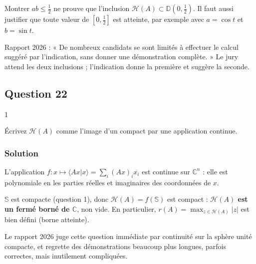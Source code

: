 \documentclass[11pt,a4paper]{article}
\newcommand{\equationajustee}[1]{%
  \sbox{\boiteequation}{$\displaystyle #1$}%
  \ifdim\wd\boiteequation>\linewidth
    \[\resizebox{\linewidth}{!}{\usebox{\boiteequation}}\]%
  \else
    \[#1\]%
  \fi}
\begin{document}
\equationajustee{\boxed{\mathcal H\begin{pmatrix}0&1\\0&0\end{pmatrix}=\mathbb D\big(0,\tfrac12\big)}}

\begin{piege}

Montrer \(ab\le\frac12\) ne prouve que l'inclusion \(\mathcal H(A)\subset\mathbb D(0,\frac12)\). Il faut aussi justifier que toute valeur de \([0,\frac12]\) est atteinte, par exemple avec \(a=\cos t\) et \(b=\sin t\).

\end{piege}

\begin{jury}

Rapport 2026 : « De nombreux candidats se sont limités à effectuer le calcul suggéré par l'indication, sans donner une démonstration complète. » Le jury attend les deux inclusions ; l'indication donne la première et suggère la seconde.

\end{jury}

\hypertarget{question-22}{%
\subsection{Question 22}\label{question-22}}

\begin{indication}{1}

Écrivez \(\mathcal H(A)\) comme l'image d'un compact par une application continue.

\end{indication}

\hypertarget{solution-21}{%
\subsubsection{Solution}\label{solution-21}}

L'application \(f:x\mapsto\langle Ax|x\rangle=\sum_i(Ax)_i\overline{x_i}\) est continue sur \(\mathbb C^n\) : elle est polynomiale en les parties réelles et imaginaires des coordonnées de \(x\).

\(\mathbb S\) est compacte (question 1), donc \(\mathcal H(A)=f(\mathbb S)\) est compact : \textbf{\(\mathcal H(A)\) est un fermé borné de \(\mathbb C\)}, non vide. En particulier, \(r(A)=\max_{z\in\mathcal H(A)}|z|\) est bien défini (borne atteinte).

\begin{jury}

Le rapport 2026 juge cette question immédiate par continuité sur la sphère unité compacte, et regrette des démonstrations beaucoup plus longues, parfois correctes, mais inutilement compliquées.

\end{jury}
\end{document}
